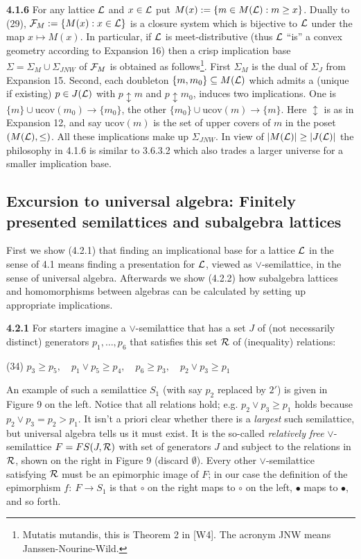 \documentclass[11pt]{article}
\newcommand{\ra}{\rightarrow}
\begin{document}
{\bf 4.1.6} For any lattice ${\cal L}$ and $x \in {\cal L}$ put $M(x) : = \{m \in M({\cal L}) : m \geq x\}$. Dually to (29), ${\cal F}_M : = \{M(x) : x \in {\cal L}\}$ is a closure system which is bijective to ${\cal L}$ under the map $x \mapsto M(x)$. In particular, if ${\cal L}$ is meet-distributive (thus ${\cal L}$ ``is'' a convex geometry according to Expansion 16) then a crisp implication base $\Sigma = \Sigma_M \cup \Sigma_{JNW}$ of ${\cal F}_M$ is obtained as follows\footnote{Mutatis mutandis, this is Theorem 2 in [W4]. The acronym JNW means Janssen-Nourine-Wild.}. First $\Sigma_M$ is the dual of $\Sigma_J$ from Expansion 15. Second, each doubleton $\{m, m_0\} \subseteq M({\cal L})$ which admits a (unique if existing) $p\in J({\cal L})$ with $p \updownarrow m$ and $p \updownarrow m_0$, induces two implications. One is $\{m\} \cup \mbox{ucov}(m_0) \ra \{m_0\}$, the other $\{m_0\} \cup \mbox{ucov}(m) \ra \{m\}$. Here $\updownarrow$ is as in Expansion 12, and say $\mbox{ucov}(m)$ is the set of upper covers of $m$ in the poset $(M({\cal L}), \leq)$. All these implications make up $\Sigma_{JNW}$. In view of $|M({\cal L})| \geq |J({\cal L})|$ the philosophy in 4.1.6 is similar to 3.6.3.2 which also trades a larger universe for a smaller implication base.





\subsection{Excursion to universal algebra: Finitely presented semilattices and subalgebra lattices}
 
First we show (4.2.1) that finding an implicational base for a lattice ${\cal L}$ in the sense of 4.1  means finding a presentation for ${\cal L}$, viewed as  $\vee$-semilattice, in the sense of universal algebra. Afterwards we show (4.2.2) how subalgebra lattices and homomorphisms between algebras can be calculated by setting up appropriate implications. 

{\bf 4.2.1} For starters imagine a $\vee$-semilattice that has a set $J$ of (not necessarily distinct) generators $p_1, \ldots, p_6$ that satisfies this set ${\cal R}$ of (inequality) relations:

(34) \quad $p_3 \geq p_5, \quad p_1 \vee p_5 \geq p_4, \quad  p_6 \geq p_3, \quad p_2 \vee p_3 \geq p_1$


 An example of such a semilattice $S_1$ (with say $p_2$ replaced by $2'$) is given in Figure 9 on the left. Notice that all relations hold; e.g. $p_2 \vee p_3 \geq p_1$ holds because $p_2 \vee p_3 = p_2 > p_1$.
It isn't a priori clear whether there is a {\it largest} such semilattice, but universal algebra tells us it must exist.
 It is the so-called {\it relatively free} $\vee$-semilattice $F = FS(J, {\cal R})$ with set of generators $J$ and subject to the relations in ${\cal R}$, shown on the right in Figure 9 (discard $\emptyset$). Every other $\vee$-semilattice satisfying ${\cal R}$ must be an epimorphic image of $F$; in our case the definition of the epimorphism $f: \ F \ra S_1$ is that $\circ$ on the right maps to $\circ$ on the left, $\bullet$ maps to $\bullet$, and so forth.
 
\end{document}
